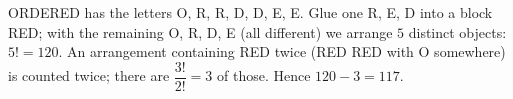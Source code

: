ORDERED has the letters O, R, R, D, D, E, E. Glue one R, E, D into a block RED; with the remaining O, R, D, E (all different) we arrange $5$ distinct objects: $5!=120$. An arrangement containing RED twice (RED RED with O somewhere) is counted twice; there are $\dfrac{3!}{2!}=3$ of those. Hence $120-3=\boxed{117}$.
